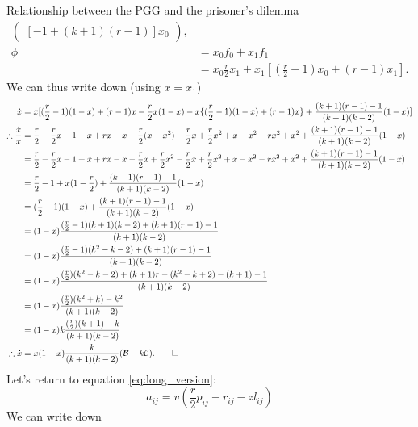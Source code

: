 \documentclass[13pt]{amsart}
\newcommand{\B}{\mathcal{B}}
\newcommand{\C}{\mathcal{C}}
\begin{document}
\begin{section}{Relationship between the PGG and the prisoner's dilemma}
\begin{equation}
\begin{split}
\begin{pmatrix}
            [-1 + (k+1)(r-1)]x_0
        \end{pmatrix},
        \\
        \phi & = x_0 f_0 + x_1 f_1
        \\
        & = x_0 \frac{r}{2}x_1 + x_1[(\frac{r}{2} - 1)x_0 + (r-1) x_1].
    \end{split}
\end{equation}
We can thus write down (using $x = x_1$)
\begin{equation}
    \begin{split}
        \dot{x} & = x [(\frac{r}{2} - 1) (1 - x) + (r-1)x - \frac{r}{2}x(1 - x) - x\{(\frac{r}{2} - 1)(1-x) + (r-1)x\} + \frac{(k+1)(r-1) - 1}{(k+1)(k-2)}(1-x)]
        \\
        \therefore \frac{\dot{x}}{x} & = \frac{r}{2} - \frac{r}{2}x - 1 + x + rx - x - \frac{r}{2}(x - x^2) - \frac{r}{2}x + \frac{r}{2}x^2 + x - x^2 - rx^2 + x^2 + \frac{(k+1)(r-1) - 1}{(k+1)(k-2)}(1-x)
        \\
        & = \frac{r}{2} - \frac{r}{2}x - 1 + x + rx - x - \frac{r}{2} x + \frac{r}{2}x^2 - \frac{r}{2}x + \frac{r}{2}x^2 + x - x^2 - rx^2 + x^2 + \frac{(k+1)(r-1) - 1}{(k+1)(k-2)}(1-x)
        \\
        & = \frac{r}{2}-1 + x(1-\frac{r}{2}) + \frac{(k+1)(r-1) - 1}{(k+1)(k-2)}(1-x)
        \\
        & = (\frac{r}{2}-1)(1-x) + \frac{(k+1)(r-1) - 1}{(k+1)(k-2)}(1-x)
        \\
        & = (1-x) \frac{(\frac{r}{2}-1)(k+1)(k-2) + (k+1)(r-1) - 1}{(k+1)(k-2)}
        \\
        & = (1-x) \frac{(\frac{r}{2}-1)(k^2 - k - 2) + (k+1)(r-1) - 1}{(k+1)(k-2)}
        \\
        & = (1-x) \frac{(\frac{r}{2})(k^2 - k - 2) + (k+1)r - (k^2 - k + 2) - (k+1) - 1}{(k+1)(k-2)}
        \\
        & = (1-x) \frac{(\frac{r}{2})(k^2 + k) - k^2}{(k+1)(k-2)}
        \\
        & = (1-x) k\frac{(\frac{r}{2})(k + 1) - k}{(k+1)(k-2)}
        \\
        \therefore \dot{x} & = x(1-x) \frac{k}{(k+1)(k-2)}(\B - k\C). \qed
    \end{split}
\end{equation}
Let's return to equation \ref{eq:long_version}:
\begin{equation}
    a_{ij} = v(\frac{r}{2} p_{ij} - r_{ij} - zl_{ij})
\end{equation}
We can write down

\end{section}
\end{document}
